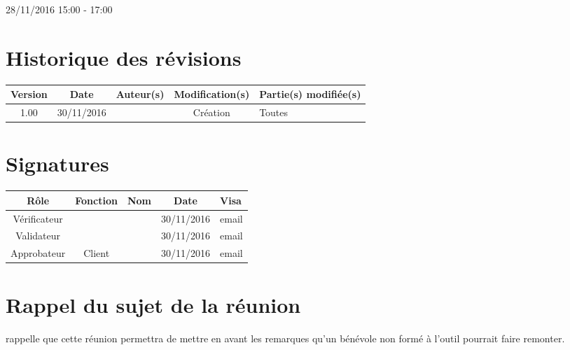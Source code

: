 \documentclass [a4paper] {article}
\begin{document}
28/11/2016			 				%
\hfill   
\hfill 	 15:00 - 17:00 				%


\section*{Historique des révisions}
\begin{center}
			\begin{tabular}{| c | c | c | c | p{4cm} |}
				\hline
				\rowcolor{Gray}
				Version & Date & Auteur(s) & Modification(s) & Partie(s) modifiée(s)		 \\
				\hline
				1.00 & 30/11/2016 & \Kafui & Création & Toutes \\
		\hline		
			\end{tabular}
		\end{center}

\section*{Signatures}

		\begin{center}
			\begin{tabular}{| c | c | c | c | p{4cm} |}
				\hline
				\rowcolor{Gray}
				Rôle & Fonction & Nom & Date & Visa		 \\
				\hline
				Vérificateur & \RGC & \Melissa & 30/11/2016 & email \\[30pt]
				\hline
				Validateur & \CP & \Pierre & 30/11/2016 & email \\[30pt]	
				\hline
				Approbateur & Client & \nomClient & 30/11/2016 & email \\[30pt]	
				\hline
			\end{tabular}
		\end{center}


\section{Rappel du sujet de la réunion}
\Pierre{} rappelle que cette réunion permettra de mettre en avant les remarques qu'un bénévole non formé à l'outil pourrait faire remonter.
\end{document}
